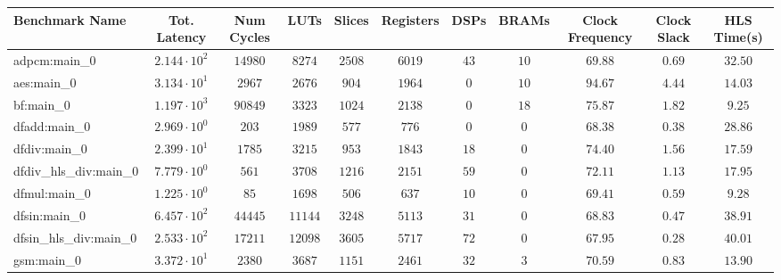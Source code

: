 \begin{tabular}{|l|c|c|c|c|c|c|c|c|c|c|}
\hline
Benchmark Name          & Tot. Latency           & Num Cycles & LUTs      & Slices    & Registers & DSPs    & BRAMs   & Clock Frequency & Clock Slack & HLS Time(s) \\
\hline
adpcm:main\_0           & $ 2.144 \cdot 10^{2} $ & $ 14980  $ & $ 8274  $ & $ 2508  $ & $ 6019  $ & $ 43  $ & $ 10  $ & $ 69.88       $ & $ 0.69    $ & $ 32.50   $ \\
aes:main\_0             & $ 3.134 \cdot 10^{1} $ & $ 2967   $ & $ 2676  $ & $ 904   $ & $ 1964  $ & $ 0   $ & $ 10  $ & $ 94.67       $ & $ 4.44    $ & $ 14.03   $ \\
bf:main\_0              & $ 1.197 \cdot 10^{3} $ & $ 90849  $ & $ 3323  $ & $ 1024  $ & $ 2138  $ & $ 0   $ & $ 18  $ & $ 75.87       $ & $ 1.82    $ & $ 9.25    $ \\
dfadd:main\_0           & $ 2.969 \cdot 10^{0} $ & $ 203    $ & $ 1989  $ & $ 577   $ & $ 776   $ & $ 0   $ & $ 0   $ & $ 68.38       $ & $ 0.38    $ & $ 28.86   $ \\
dfdiv:main\_0           & $ 2.399 \cdot 10^{1} $ & $ 1785   $ & $ 3215  $ & $ 953   $ & $ 1843  $ & $ 18  $ & $ 0   $ & $ 74.40       $ & $ 1.56    $ & $ 17.59   $ \\
dfdiv\_hls\_div:main\_0 & $ 7.779 \cdot 10^{0} $ & $ 561    $ & $ 3708  $ & $ 1216  $ & $ 2151  $ & $ 59  $ & $ 0   $ & $ 72.11       $ & $ 1.13    $ & $ 17.95   $ \\
dfmul:main\_0           & $ 1.225 \cdot 10^{0} $ & $ 85     $ & $ 1698  $ & $ 506   $ & $ 637   $ & $ 10  $ & $ 0   $ & $ 69.41       $ & $ 0.59    $ & $ 9.28    $ \\
dfsin:main\_0           & $ 6.457 \cdot 10^{2} $ & $ 44445  $ & $ 11144 $ & $ 3248  $ & $ 5113  $ & $ 31  $ & $ 0   $ & $ 68.83       $ & $ 0.47    $ & $ 38.91   $ \\
dfsin\_hls\_div:main\_0 & $ 2.533 \cdot 10^{2} $ & $ 17211  $ & $ 12098 $ & $ 3605  $ & $ 5717  $ & $ 72  $ & $ 0   $ & $ 67.95       $ & $ 0.28    $ & $ 40.01   $ \\
gsm:main\_0             & $ 3.372 \cdot 10^{1} $ & $ 2380   $ & $ 3687  $ & $ 1151  $ & $ 2461  $ & $ 32  $ & $ 3   $ & $ 70.59       $ & $ 0.83    $ & $ 13.90   $ \\

\end{tabular}
